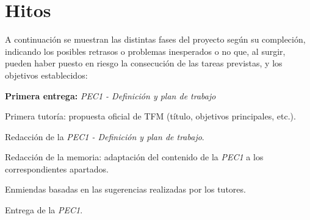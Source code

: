 \documentclass[IB,BIB]{TFUOC}%
\newcommand{\checkbox}{\text{\fboxsep=-.15pt\fbox{\rule{0pt}{1.5ex}\rule{1.5ex}{0pt}}}} %
\newcommand{\cmark}{\ding{51}} %
\newcommand{\xmark}{\ding{55}} %
\newcommand{\done}{\rlap{\checkbox}{\raisebox{1.2pt}{\large\hspace{1pt}\cmark}}
\hspace{-2.5pt}}
\newcommand{\wontfix}{\rlap{\checkbox}{\raisebox{-1.5pt}{\large\hspace{-.75pt}\xmark}}
\hspace{-2.5pt}}
\begin{document}
\newpage


\section{Hitos}
\label{sec:Hitos}

A continuación se muestran las distintas fases del proyecto según su compleción, indicando los posibles retrasos o problemas inesperados o no que, al surgir, pueden haber puesto en riesgo la consecución de las tareas previstas, y los objetivos establecidos:


\begin{todolist}
  \item[\done] \textbf{Primera entrega:} \textit{PEC1 - Definición y plan de trabajo}
  \begin{todolist}
  \item[\done] Primera tutoría: propuesta oficial de TFM (título, objetivos principales, etc.).
  \item[\done] Redacción de la \textit{PEC1 - Definición y plan de trabajo}.
  \item[\done] Redacción de la memoria: adaptación del contenido de la \textit{PEC1} a los correspondientes apartados.
  \item[\done] Enmiendas basadas en las sugerencias realizadas por los tutores.
  \item[\done] Entrega de la \textit{PEC1}.
  \end{todolist}
\end{todolist}
\end{document}
